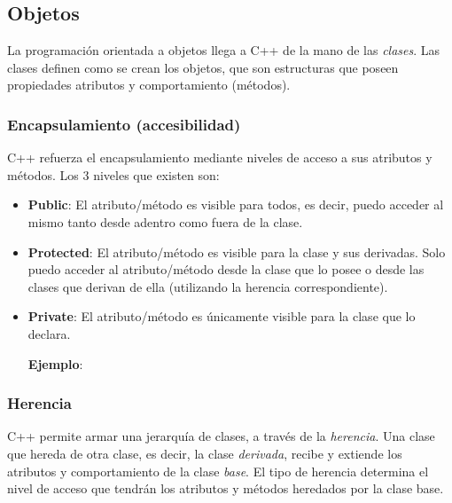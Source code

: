\documentclass[a4paper, twoside]{article}
\newcommand{\codedir}{../resources/code} %
\begin{document}
\subsection{Objetos}
La programación orientada a objetos llega a C++ de la mano de las \emph{clases}. Las clases definen como se crean los objetos, que son estructuras que poseen propiedades atributos y comportamiento (métodos).

\subsubsection{Encapsulamiento (accesibilidad)}
C++ refuerza el encapsulamiento mediante niveles de acceso a sus atributos y métodos. Los 3 niveles que existen son:
\begin{itemize}
	\item \textbf{Public}: El atributo/método es visible para todos, es decir, puedo acceder al mismo tanto desde adentro como fuera de la clase.
	\item \textbf{Protected}: El atributo/método es visible para la clase y sus derivadas. Solo puedo acceder al atributo/método desde la clase que lo posee o desde las clases que derivan de ella (utilizando la herencia correspondiente).
	\item \textbf{Private}: El atributo/método es únicamente visible para la clase que lo declara.

\textbf{Ejemplo}:


\end{itemize}
\subsubsection{Herencia}
C++ permite armar una jerarquía de clases, a través de la \emph{herencia}. Una clase que hereda de otra clase, es decir, la clase \emph{derivada}, recibe y extiende los atributos y comportamiento de la clase \emph{base}.
El tipo de herencia determina el nivel de acceso que tendrán los atributos y métodos heredados por la clase base.

\end{document}

